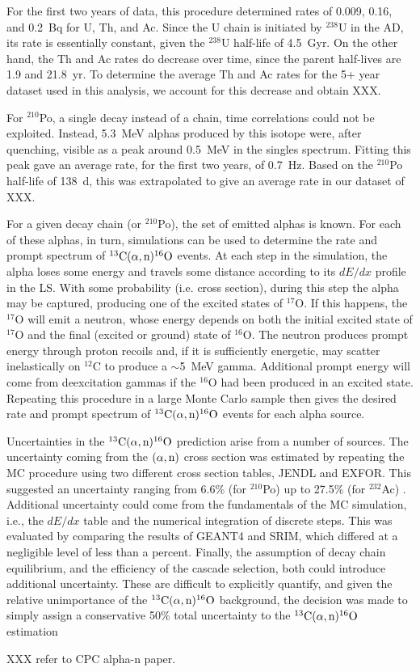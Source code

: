 \documentclass[../thesis.tex]{subfiles}
\begin{document}
For the first two years of data, this procedure determined rates of 0.009, 0.16,
and 0.2~Bq for U, Th, and Ac. Since the U chain is initiated by $^{238}$U in the
AD, its rate is essentially constant, given the $^{238}$U half-life of
4.5~Gyr. On the other hand, the Th and Ac rates do decrease over time, since the
parent half-lives are 1.9 and 21.8~yr. To determine the average Th and Ac rates
for the 5+ year dataset used in this analysis, we account for this decrease and
obtain XXX.

For $^{210}$Po, a single decay instead of a chain, time correlations could not
be exploited. Instead, 5.3~MeV alphas produced by this isotope were, after
quenching, visible as a peak around 0.5~MeV in the singles spectrum. Fitting
this peak gave an average rate, for the first two years, of 0.7~Hz. Based on the
$^{210}$Po half-life of 138~d, this was extrapolated to give an average rate in
our dataset of XXX.

For a given decay chain (or $^{210}$Po), the set of emitted alphas is known. For
each of these alphas, in turn, simulations can be used to determine the rate and
prompt spectrum of $^{13}\mathrm{C}(\alpha, \mathrm{n})^{16}\mathrm{O}$ events. At each step in the simulation, the alpha
loses some energy and travels some distance according to its $dE/dx$ profile in
the LS. With some probability (i.e. cross section), during this step the alpha
may be captured, producing one of the excited states of $^{17}$O. If this
happens, the $^{17}$O will emit a neutron, whose energy depends on both the
initial excited state of $^{17}$O and the final (excited or ground) state of
$^{16}$O. The neutron produces prompt energy through proton recoils and, if it
is sufficiently energetic, may scatter inelastically on $^{12}$C to produce a
$\sim$5~MeV gamma. Additional prompt energy will come from deexcitation gammas
if the $^{16}$O had been produced in an excited state. Repeating this procedure
in a large Monte Carlo sample then gives the desired rate and prompt spectrum of
$^{13}\mathrm{C}(\alpha, \mathrm{n})^{16}\mathrm{O}$ events for each alpha source.

Uncertainties in the $^{13}\mathrm{C}(\alpha, \mathrm{n})^{16}\mathrm{O}$ prediction arise from a number of sources. The
uncertainty coming from the $(\alpha,\mathrm{n})$ cross section was estimated by repeating
the MC procedure using two different cross section tables, JENDL and EXFOR. This
suggested an uncertainty ranging from 6.6\% (for $^{210}$Po) up to 27.5\% (for
$^{232}$Ac) \cite{Zhao_2014}. Additional uncertainty could come from the
fundamentals of the MC simulation, i.e., the $dE/dx$ table and the numerical
integration of discrete steps. This was evaluated by comparing the results of
GEANT4 and SRIM, which differed at a negligible level of less than a
percent. Finally, the assumption of decay chain equilibrium, and the efficiency
of the cascade selection, both could introduce additional uncertainty. These are
difficult to explicitly quantify, and given the relative unimportance of the
$^{13}\mathrm{C}(\alpha, \mathrm{n})^{16}\mathrm{O}$ background, the decision was made to simply assign a conservative 50\%
total uncertainty to the $^{13}\mathrm{C}(\alpha, \mathrm{n})^{16}\mathrm{O}$ estimation

XXX refer to CPC alpha-n paper.
\end{document}
